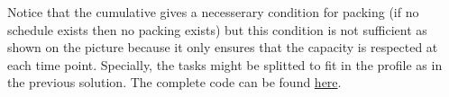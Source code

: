 
Notice that the cumulative gives a necesserary condition for packing (if no schedule exists then no packing exists) but this condition is not sufficient as shown on the picture because it only ensures that the capacity is respected at each time point. Specially, the tasks might be splitted to fit in the profile as in the previous solution.
The complete code can be found \hyperlink{cumulative:cumulativeconstraint}{here}.

